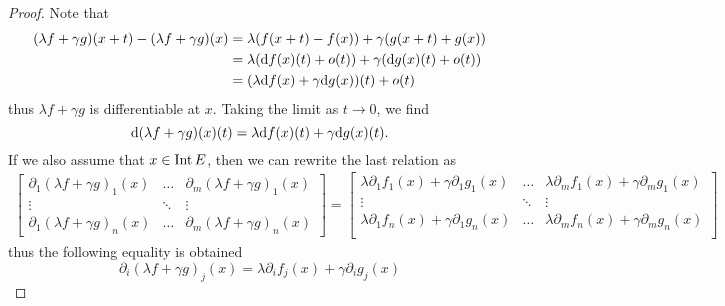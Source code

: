 \begin{proof}
  Note that
  \begin{align*}
    (\lambda f + \gamma g)(x + t) - (\lambda f + \gamma g)(x)
    &= \lambda (f(x + t) - f(x)) + \gamma (g(x + t) + g(x)) \\
    &= \lambda(\mathrm{d} f(x)(t) + o(t)) + \gamma(\mathrm{d} g(x)(t) + o(t)) \\
    &= (\lambda \mathrm{d} f(x) + \gamma \mathrm{d} g(x))(t) + o(t)
  \end{align*}
  thus \(\lambda f + \gamma g\) is differentiable at \(x\). Taking the limit as
  \(t \to 0\), we find
  \[
    \mathrm{d}(\lambda f + \gamma g)(x)(t)
    = \lambda \mathrm{d} f(x)(t) + \gamma \mathrm{d} g(x)(t).
  \]
  If we also assume that \(x \in \operatorname{Int} E\), then we can rewrite the last relation
  as
  \begin{align*}
    \begin{bmatrix}
      \partial_1 (\lambda f + \gamma g)_1(x) &\dots &\partial_m (\lambda f +
      \gamma g)_1(x) \\
      \vdots &\ddots &\vdots \\
      \partial_1 (\lambda f + \gamma g)_n(x) &\dots &\partial_m(\lambda f +
      \gamma g)_n(x)
    \end{bmatrix}
    =
    \begin{bmatrix}
      \lambda \partial_1 f_1(x) + \gamma \partial_1 g_1(x) &\dots &\lambda
      \partial_m f_1(x) + \gamma \partial_m g_1(x) \\
      \vdots &\ddots &\vdots \\
      \lambda \partial_1 f_n(x) + \gamma \partial_1 g_n(x) &\dots &\lambda
      \partial_m f_n(x) + \gamma \partial_m g_n(x) \\
    \end{bmatrix}
  \end{align*}
  thus the following equality is obtained
  \[
    \partial_i (\lambda f + \gamma g)_j(x) = \lambda \partial_i f_j(x) + \gamma
    \partial_i g_j(x)
  \]
\end{proof}

